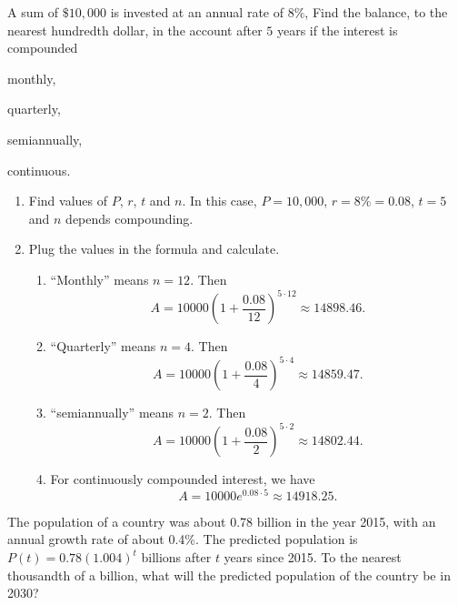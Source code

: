 	\begin{example}
		A sum of $\$10,000$ is invested at an annual rate of $8\%$, Find the balance, to the nearest hundredth dollar,  in the account after $5$ years if the interest is compounded \\
		\begin{enumerate*}[label={(\arabic*)~}]
			\item monthly,
			\item quarterly,
			\item semiannually,
			\item continuous.\hfill\null
		\end{enumerate*}
	\end{example}
	\begin{solution}
		\mbox{}\vspace{-0.25em}
		\begin{enumerate}[label={\textbf{\textup{Step \arabic*.}}~}]
			\item Find values of $P$, $r$, $t$ and $n$. In this case,
					$P=10,000$, $r=8\%=0.08$, $t=5$ and $n$ depends compounding.
			\item Plug the values in the formula and calculate.
					\begin{enumerate}[label=\emph{(\arabic*)~}]
						\item ``Monthly'' means $n=12$. Then
							\[A=10000\left(1+\frac{0.08}{12}\right)^{5\cdot 12}\approx 14898.46.\]
						\item ``Quarterly'' means $n=4$. Then
							\[A=10000\left(1+\frac{0.08}{4}\right)^{5\cdot 4}\approx 14859.47.\]
						\item ``semiannually'' means $n=2$. Then
							\[A=10000\left(1+\frac{0.08}{2}\right)^{5\cdot 2}\approx 14802.44.\]
						\item For continuously compounded interest, we have
							\[A=10000e^{0.08\cdot 5}\approx 14918.25.\]
					\end{enumerate}
		\end{enumerate}
	\end{solution}


	\begin{example}
		The population of a country was about 0.78 billion in the year 2015,
		with an annual growth rate of about 0.4\%.
		The predicted population is $P(t)=0.78(1.004)^t$ billions after $t$ years since 2015.
		To the nearest thousandth of a billion, what will the predicted population of the country be in 2030?
	\end{example}

